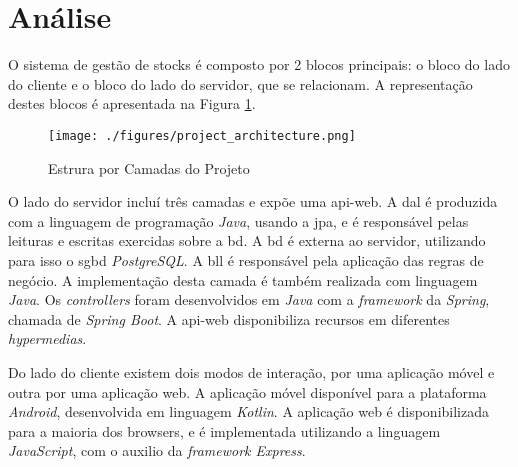 %
%
\section{Análise}\label{sec32}

O sistema de gestão de stocks é composto por 2 blocos principais: o bloco do lado do cliente e o bloco do lado do servidor, que se relacionam. A representação destes blocos é apresentada na Figura \ref{project-layers-structure}. 

\begin{figure}[H]
	\centering
	\texttt{[image: ./figures/project\_architecture.png]}
	\caption{Estrura por Camadas do Projeto}
	\label{project-layers-structure}
\end{figure}

O lado do servidor incluí três camadas e expõe uma \gls{api-web}. A \acrfull{dal} é produzida com a linguagem de programação \textit{Java}, usando a \acrfull{jpa}, e é responsável pelas leituras e escritas exercidas sobre a \acrfull{bd}. A \acrshort{bd} é externa ao servidor, utilizando para isso o \acrfull{sgbd} \textit{PostgreSQL}. A \acrfull{bll} é responsável pela aplicação das regras de negócio. A implementação desta camada é também realizada com linguagem \textit{Java}. Os \textit{controllers} foram desenvolvidos em \textit{Java} com a \textit{framework} da \textit{Spring}, chamada de \textit{Spring Boot}. A \gls{api-web} disponibiliza recursos em diferentes \textit{hypermedias}.

Do lado do cliente existem dois modos de interação, por uma aplicação móvel e outra por uma aplicação web. A aplicação móvel disponível para a plataforma \textit{Android}, desenvolvida em linguagem \textit{Kotlin}. A aplicação web é disponibilizada para a maioria dos browsers, e é implementada utilizando a linguagem \textit{JavaScript}, com o auxilio da \textit{framework Express}.
